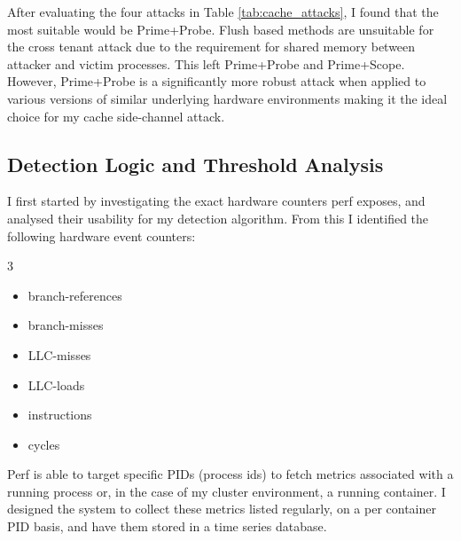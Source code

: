 \documentclass[11pt,a4paper, notitlepage]{article}
\begin{document}
\begin{table}[!htbp]
\centering
{}
\caption{\small{Evaluation of Cache Side-Channel Attacks on Public Cloud Environments}}
\label{tab:cache_attacks}
\end{table}
After evaluating the four attacks in Table \ref{tab:cache_attacks}, I found that the most suitable would be Prime+Probe. Flush based
methods are unsuitable for the cross tenant attack due to the requirement for shared memory between attacker and victim processes. This left 
Prime+Probe and Prime+Scope. However, Prime+Probe is a significantly more robust attack when applied to 
various versions of similar underlying hardware environments making it the ideal choice for my cache side-channel attack.

\subsection{Detection Logic and Threshold Analysis}
I first started by investigating the exact hardware counters perf exposes, and analysed their usability for my detection algorithm. 
From this I identified the following hardware event counters:
\begin{multicols}{3}
\begin{itemize}[nosep]
    \item branch-references
    \item branch-misses
    \item LLC-misses
    \item LLC-loads
    \item instructions
    \item cycles
\end{itemize}
\end{multicols}
Perf is able to target specific PIDs (process ids) to fetch metrics associated with a running process or, in the case of my 
cluster environment, a running container. I designed the system to collect these metrics listed regularly, on a per container PID basis, 
and have them stored in a time series database. 
\end{document}
